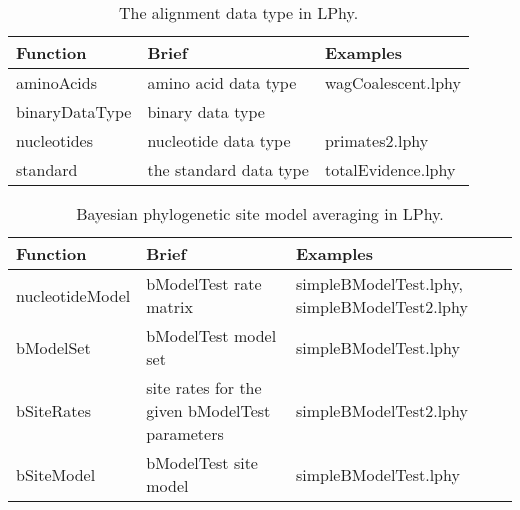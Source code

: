 \documentclass[12pt]{article} %
\begin{document}
\begin{table}
\begin{tabular}{ l | l | l }
    \hline\hline
    Function & Brief & Examples \\ 
    \hline\hline
    aminoAcids & amino acid data type & wagCoalescent.lphy\\  
    binaryDataType & binary data type & \\  
    nucleotides & nucleotide data type & primates2.lphy\\  
    standard & the standard data type & totalEvidence.lphy\\  
    \hline
\end{tabular}
\label{tab:coalescent}
\caption{The alignment data type in LPhy.}
\end{table}

\begin{table}
\begin{tabular}{ l | l | l }
    \hline\hline
    Function & Brief & Examples \\ 
    \hline\hline
    nucleotideModel & bModelTest\cite{bouckaert2017bmodeltestcomparison} rate matrix & simpleBModelTest.lphy, simpleBModelTest2.lphy\\  
    bModelSet & bModelTest model set & simpleBModelTest.lphy\\  
    bSiteRates & site rates for the given bModelTest parameters & simpleBModelTest2.lphy\\  
    bSiteModel & bModelTest site model & simpleBModelTest.lphy\\  
        \hline
\end{tabular}
\label{tab:coalescent}
\caption{Bayesian phylogenetic site model averaging in LPhy.}
\end{table}





\end{document}
